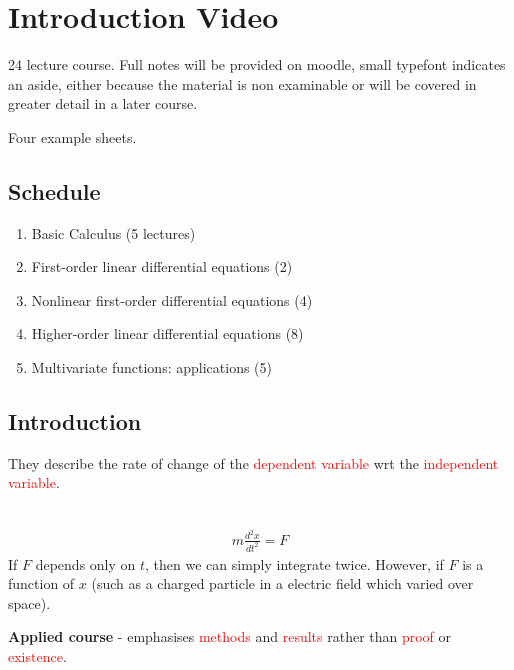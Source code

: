 \setcounter{section}{-1}

\hypertarget{introduction-video}{%
\section{Introduction Video}\label{introduction-video}}

24 lecture course. 
Full notes will be provided on moodle, small typefont indicates an aside, either because the material is non examinable or will be covered in greater detail in a later course.

Four example sheets.

\hypertarget{schedule}{%
\subsection{Schedule}\label{schedule}}

\begin{enumerate}
\def\labelenumi{\arabic{enumi}.}
\tightlist
\item
  Basic Calculus (5 lectures)
\item
  First-order linear differential equations (2)
\item
  Nonlinear first-order differential equations (4)
\item
  Higher-order linear differential equations (8)
\item
  Multivariate functions: applications (5)
\end{enumerate}

\hypertarget{introduction}{%
\subsection{Introduction}\label{introduction}}

They describe the rate of change of the \textcolor{red}{dependent variable} wrt the \textcolor{red}{independent variable}.

\begin{example} ~\vspace*{-1.5\baselineskip}
\begin{align*}
  m \frac{d^2 x}{d t^2} = F
\end{align*}
If \(F\) depends only on \(t\), then we can simply integrate twice. However, if \(F\) is a function of \(x\) (such as a charged particle in a electric field which varied over space).
\end{example}

\textbf{Applied course} - emphasises \textcolor{red}{methods} and \textcolor{red}{results} rather than \textcolor{red}{proof} or \textcolor{red}{existence}.

